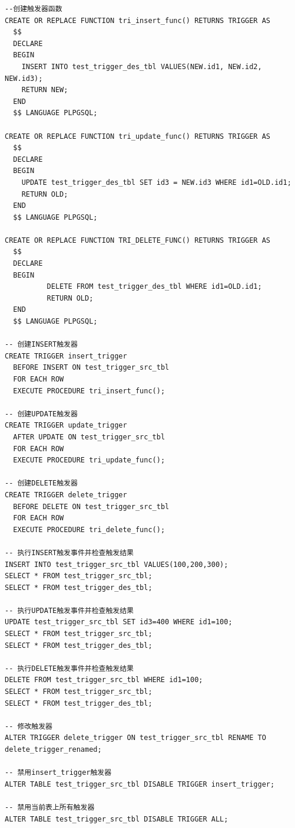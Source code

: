 \begin{enumerate}
\begin{center}
\begin{verbatim}
--创建触发器函数
CREATE OR REPLACE FUNCTION tri_insert_func() RETURNS TRIGGER AS
  $$
  DECLARE
  BEGIN
    INSERT INTO test_trigger_des_tbl VALUES(NEW.id1, NEW.id2, NEW.id3);
    RETURN NEW;
  END
  $$ LANGUAGE PLPGSQL;

CREATE OR REPLACE FUNCTION tri_update_func() RETURNS TRIGGER AS
  $$
  DECLARE
  BEGIN
    UPDATE test_trigger_des_tbl SET id3 = NEW.id3 WHERE id1=OLD.id1;
    RETURN OLD;
  END
  $$ LANGUAGE PLPGSQL;

CREATE OR REPLACE FUNCTION TRI_DELETE_FUNC() RETURNS TRIGGER AS
  $$
  DECLARE
  BEGIN
          DELETE FROM test_trigger_des_tbl WHERE id1=OLD.id1;
          RETURN OLD;
  END
  $$ LANGUAGE PLPGSQL;

-- 创建INSERT触发器
CREATE TRIGGER insert_trigger
  BEFORE INSERT ON test_trigger_src_tbl
  FOR EACH ROW
  EXECUTE PROCEDURE tri_insert_func();

-- 创建UPDATE触发器
CREATE TRIGGER update_trigger
  AFTER UPDATE ON test_trigger_src_tbl
  FOR EACH ROW
  EXECUTE PROCEDURE tri_update_func();

-- 创建DELETE触发器
CREATE TRIGGER delete_trigger
  BEFORE DELETE ON test_trigger_src_tbl
  FOR EACH ROW
  EXECUTE PROCEDURE tri_delete_func();

-- 执行INSERT触发事件并检查触发结果
INSERT INTO test_trigger_src_tbl VALUES(100,200,300);
SELECT * FROM test_trigger_src_tbl;
SELECT * FROM test_trigger_des_tbl;

-- 执行UPDATE触发事件并检查触发结果
UPDATE test_trigger_src_tbl SET id3=400 WHERE id1=100;
SELECT * FROM test_trigger_src_tbl;
SELECT * FROM test_trigger_des_tbl;

-- 执行DELETE触发事件并检查触发结果
DELETE FROM test_trigger_src_tbl WHERE id1=100;
SELECT * FROM test_trigger_src_tbl;
SELECT * FROM test_trigger_des_tbl;

-- 修改触发器
ALTER TRIGGER delete_trigger ON test_trigger_src_tbl RENAME TO delete_trigger_renamed;

-- 禁用insert_trigger触发器
ALTER TABLE test_trigger_src_tbl DISABLE TRIGGER insert_trigger;

-- 禁用当前表上所有触发器
ALTER TABLE test_trigger_src_tbl DISABLE TRIGGER ALL;


\end{verbatim}
\end{center}
\end{enumerate}
